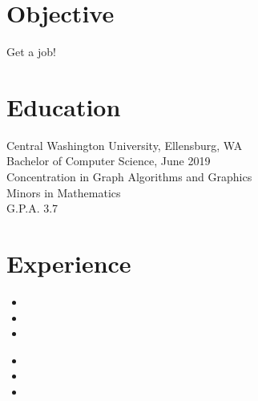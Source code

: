 \documentclass[10pt, a4paper]{article}
\begin{document}

\section*{Objective}
\vspace{-0.05in}
\hspace*{0.1in}
\begin{minipage}{.8\textwidth}
  Get a job!
\end{minipage}
\vspace{-10pt}

\section*{Education}
\vspace{-0.05in}
\hspace*{0.1in}
\begin{minipage}{.8\textwidth}
  Central Washington University, Ellensburg, WA \\
  Bachelor of Computer Science, June 2019 \\
  Concentration in Graph Algorithms and Graphics \\
  Minors in Mathematics \\
  G.P.A. 3.7
\end{minipage}
\vspace{-10pt}

\section*{Experience}

\noindent
{
  \hfill
  \hfill
}
\vspace{-0.1in}
\begin{itemize}
  \item \lipsum[1][1]
        \vspace{-0.1in}
  \item \lipsum[1][2]
        \vspace{-0.1in}
  \item \lipsum[1][3]
        \vspace{-0.05in}
\end{itemize}

\noindent
{
  \hfill
  \hfill
}
\vspace{-0.1in}
\begin{itemize}
  \item \lipsum[1][1]
        \vspace{-0.1in}
  \item \lipsum[1][2]
        \vspace{-0.1in}
  \item \lipsum[1][3]
        \vspace{-0.05in}
\end{itemize}
\end{document}
